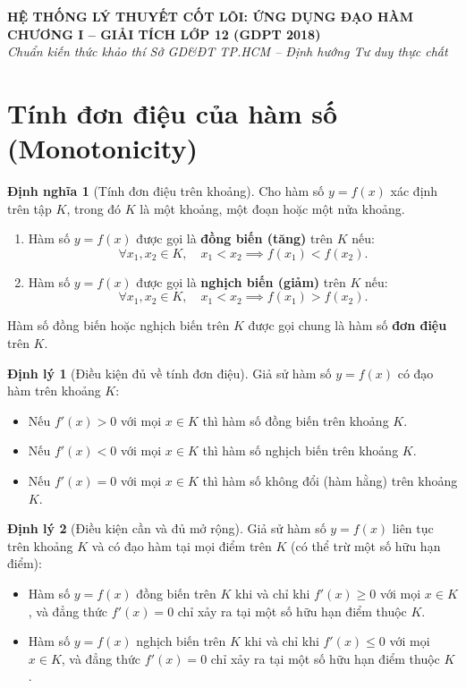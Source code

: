 \documentclass[12pt,a4paper]{article}
\theoremstyle{definition}
\newtheorem{dn}{Định nghĩa}[section]
\newtheorem{dl}{Định lý}[section]
\begin{document}
\begin{center}
    {\Large \textbf{HỆ THỐNG LÝ THUYẾT CỐT LÕI: ỨNG DỤNG ĐẠO HÀM}}\\[2mm]
    {\large \textbf{CHƯƠNG I -- GIẢI TÍCH LỚP 12 (GDPT 2018)}}\\[1mm]
    {\normalsize \textit{Chuẩn kiến thức khảo thí Sở GD\&ĐT TP.HCM -- Định hướng Tư duy thực chất}}
\end{center}

\vspace{5mm}

\section{Tính đơn điệu của hàm số (Monotonicity)}

\begin{dn}[Tính đơn điệu trên khoảng]
Cho hàm số $y = f(x)$ xác định trên tập $K$, trong đó $K$ là một khoảng, một đoạn hoặc một nửa khoảng.
\begin{enumerate}
    \item[a)] Hàm số $y = f(x)$ được gọi là \textbf{đồng biến (tăng)} trên $K$ nếu:
    \[
    \forall x_1, x_2 \in K, \quad x_1 < x_2 \implies f(x_1) < f(x_2).
    \]
    \item[b)] Hàm số $y = f(x)$ được gọi là \textbf{nghịch biến (giảm)} trên $K$ nếu:
    \[
    \forall x_1, x_2 \in K, \quad x_1 < x_2 \implies f(x_1) > f(x_2).
    \]
\end{enumerate}
Hàm số đồng biến hoặc nghịch biến trên $K$ được gọi chung là hàm số \textbf{đơn điệu} trên $K$.
\end{dn}

\begin{dl}[Điều kiện đủ về tính đơn điệu]
Giả sử hàm số $y = f(x)$ có đạo hàm trên khoảng $K$:
\begin{itemize}
    \item Nếu $f'(x) > 0$ với mọi $x \in K$ thì hàm số đồng biến trên khoảng $K$.
    \item Nếu $f'(x) < 0$ với mọi $x \in K$ thì hàm số nghịch biến trên khoảng $K$.
    \item Nếu $f'(x) = 0$ với mọi $x \in K$ thì hàm số không đổi (hàm hằng) trên khoảng $K$.
\end{itemize}
\end{dl}

\begin{dl}[Điều kiện cần và đủ mở rộng]
Giả sử hàm số $y = f(x)$ liên tục trên khoảng $K$ và có đạo hàm tại mọi điểm trên $K$ (có thể trừ một số hữu hạn điểm):
\begin{itemize}
    \item Hàm số $y = f(x)$ đồng biến trên $K$ khi và chỉ khi $f'(x) \ge 0$ với mọi $x \in K$, và đẳng thức $f'(x) = 0$ chỉ xảy ra tại một số hữu hạn điểm thuộc $K$.
    \item Hàm số $y = f(x)$ nghịch biến trên $K$ khi và chỉ khi $f'(x) \le 0$ với mọi $x \in K$, và đẳng thức $f'(x) = 0$ chỉ xảy ra tại một số hữu hạn điểm thuộc $K$.
\end{itemize}
\end{dl}
\end{document}
